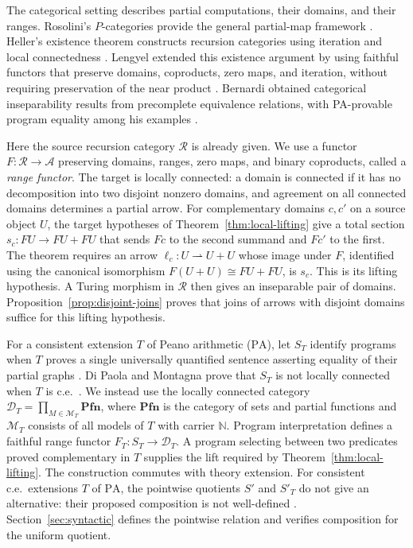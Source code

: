 \documentclass[11pt]{article}
\newcommand{\N}{\mathbb N}
\newcommand{\PA}{\mathrm{PA}}
\newcommand{\Pfn}{\mathbf{Pfn}}
\begin{document}
The categorical setting describes partial computations, their domains,
and their ranges. Rosolini's $P$-categories provide the general
partial-map framework \cite{RosoliniThesis,Rosolini}.
Heller's existence theorem constructs recursion categories using
iteration and local connectedness \cite[Sections 8--9]{Heller}.
Lengyel extended this existence argument by using faithful functors
that preserve domains, coproducts, zero maps, and iteration, without
requiring preservation of the near product \cite{Lengyel2004,Corrections}.
Bernardi obtained categorical inseparability results from precomplete
equivalence relations, with PA-provable program equality among his
examples \cite[pp.~125--128]{Bernardi}.

Here the source recursion category $\mathscr R$ is already given.
We use a functor $F:\mathscr R\to\mathcal A$ preserving domains,
ranges, zero maps, and binary coproducts, called a \emph{range functor}.
The target is locally connected: a domain is connected if it has no
decomposition into two disjoint nonzero domains, and agreement on all
connected domains determines a partial arrow. For complementary domains
$c,c'$ on a source object $U$, the target hypotheses of
Theorem~\ref{thm:local-lifting} give a total section
$s_c:FU\to FU+FU$ that sends $Fc$ to the second summand and $Fc'$
to the first. The theorem requires an arrow
$\ell_c:U\rightharpoonup U+U$ whose image under $F$, identified
using the canonical isomorphism $F(U+U)\cong FU+FU$, is $s_c$.
This is its lifting hypothesis. A Turing morphism in $\mathscr R$
then gives an inseparable pair of domains. Proposition~\ref{prop:disjoint-joins}
proves that joins of arrows with disjoint domains suffice for this
lifting hypothesis.

For a consistent extension $T$ of Peano arithmetic ($\PA$), let
$S_T$ identify programs when $T$ proves a single universally quantified
sentence asserting equality of their partial graphs
\cite{Montagna,DPM}. Di Paola and Montagna prove that $S_T$ is not
locally connected when $T$ is c.e.\ \cite[Corollary 4.4]{DPM}.
We instead use the locally connected category
$\mathcal D_T=\prod_{M\in\mathcal M_T}\Pfn$, where $\Pfn$ is the
category of sets and partial functions and $\mathcal M_T$ consists of
all models of $T$ with carrier $\N$. Program interpretation defines a
faithful range functor $F_T:S_T\to\mathcal D_T$. A program selecting
between two predicates proved complementary in $T$ supplies the lift
required by Theorem~\ref{thm:local-lifting}. The construction commutes
with theory extension. For consistent c.e.\ extensions $T$ of $\PA$,
the pointwise quotients $S'$ and $S'_T$ do not give an alternative:
their proposed composition is not well-defined
\cite[Corollary 2]{Composition}. Section~\ref{sec:syntactic} defines
the pointwise relation and verifies composition for the uniform quotient.
\end{document}
